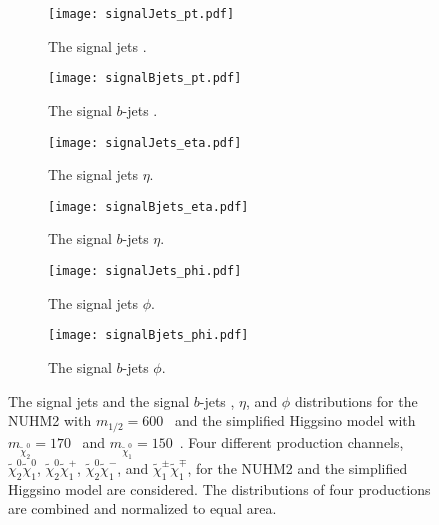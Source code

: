 \begin{figure}[htbp]
    \begin{center}
        \begin{subfigure}[b]{0.48\textwidth}
            \texttt{[image: signalJets\_pt.pdf]}
            \caption{The signal jets \pt.}
        \end{subfigure}
        \begin{subfigure}[b]{0.48\textwidth}
            \texttt{[image: signalBjets\_pt.pdf]}
            \caption{The signal $b$-jets \pt.}
        \end{subfigure}
        \begin{subfigure}[b]{0.48\textwidth}
            \texttt{[image: signalJets\_eta.pdf]}
            \caption{The signal jets $\eta$.}
        \end{subfigure}
        \begin{subfigure}[b]{0.48\textwidth}
            \texttt{[image: signalBjets\_eta.pdf]}
            \caption{The signal $b$-jets $\eta$.}
        \end{subfigure}
        \begin{subfigure}[b]{0.48\textwidth}
            \texttt{[image: signalJets\_phi.pdf]}
            \caption{The signal jets $\phi$.}
        \end{subfigure}
        \begin{subfigure}[b]{0.48\textwidth}
            \texttt{[image: signalBjets\_phi.pdf]}
            \caption{The signal $b$-jets $\phi$.}
        \end{subfigure}
    \end{center}
    \caption{The signal jets and the signal $b$-jets \pt, $\eta$, and $\phi$ distributions for the NUHM2 with $m_{1/2} = 600$~{\GeV} and the simplified Higgsino model with $m_{\widetilde{\chi}^{0}_{2}}=170$~{\GeV} and $m_{\widetilde{\chi}^{0}_{1}}=150$~{\GeV}.
    Four different production channels, $\widetilde{\chi}^{0}_{2}\widetilde{\chi}^{0}_{1}$, $\widetilde{\chi}^{0}_{2}\widetilde{\chi}^{+}_{1}$, $\widetilde{\chi}^{0}_{2}\widetilde{\chi}^{-}_{1}$, and $\widetilde{\chi}^{\pm}_{1}\widetilde{\chi}^{\mp}_{1}$, for the NUHM2 and the simplified Higgsino model are considered.
    The distributions of four productions are combined and normalized to equal area.}
    \label{fig:results_nuhm2_jets_bjets_pt_eta_phi}
\end{figure}

